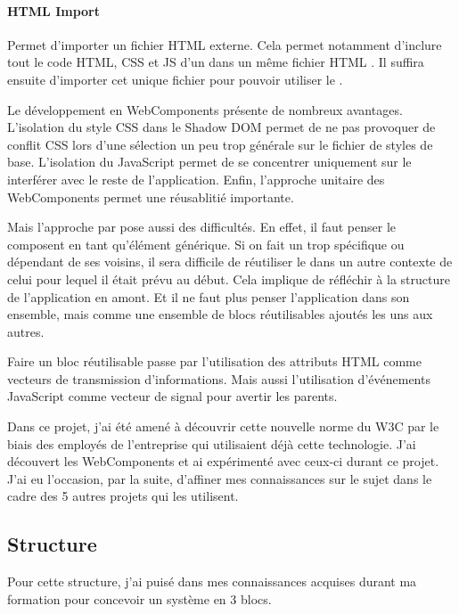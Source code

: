 \paragraph{HTML Import} Permet d'importer un fichier HTML externe.
Cela permet notamment d'inclure tout le code HTML, CSS et JS d'un \component dans un même fichier HTML .
Il suffira ensuite d'importer cet unique fichier pour pouvoir utiliser le \component.

\bigskip

Le développement en WebComponents présente de nombreux avantages.
L'isolation du style CSS dans le Shadow DOM permet de ne pas provoquer de conflit CSS lors d'une sélection un peu trop générale sur le fichier de styles de base.
L'isolation du JavaScript permet de se concentrer uniquement sur le \component interférer avec le reste de l'application.
Enfin, l'approche unitaire des WebComponents permet une réusablitié importante.

Mais l'approche par \component pose aussi des difficultés.
En effet, il faut penser le composent en tant qu'élément générique.
Si on fait un \component trop spécifique ou dépendant de ses voisins, il sera difficile de réutiliser le \component dans un autre contexte de celui pour lequel il était prévu au début.
Cela implique de réfléchir à la structure de l'application en amont.
Et il ne faut plus penser l'application dans son ensemble, mais comme une ensemble de blocs réutilisables ajoutés les uns aux autres.

Faire un bloc réutilisable passe par l'utilisation des attributs HTML comme vecteurs de transmission d'informations.
Mais aussi l'utilisation d'événements JavaScript comme vecteur de signal pour avertir les parents.

\bigskip

Dans ce projet, j'ai été amené à découvrir cette nouvelle norme du W3C par le biais des employés de l'entreprise qui utilisaient déjà cette technologie.
J'ai découvert les WebComponents et ai expérimenté avec ceux-ci durant ce projet.
J'ai eu l'occasion, par la suite, d'affiner mes connaissances sur le sujet dans le cadre des 5 autres projets qui les utilisent.

\subsection{Structure}

Pour cette structure, j'ai puisé dans mes connaissances acquises durant ma formation pour concevoir un système en 3 blocs.

